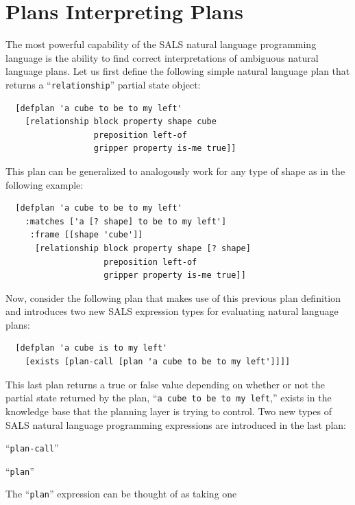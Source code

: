 \section{Plans Interpreting Plans}
\label{section:plans_interpreting_plans}

The most powerful capability of the SALS natural language programming
language is the ability to find correct interpretations of ambiguous
natural language plans.  Let us first define the following simple
natural language plan that returns a ``{\tt{relationship}}'' partial
state object:
\begin{samepage}
\begin{Verbatim}
  [defplan 'a cube to be to my left'
    [relationship block property shape cube
                  preposition left-of
                  gripper property is-me true]]
\end{Verbatim}
\end{samepage}
This plan can be generalized to analogously work for any type of shape
as in the following example:
\begin{samepage}
\begin{Verbatim}
  [defplan 'a cube to be to my left'
    :matches ['a [? shape] to be to my left']
     :frame [[shape 'cube']]
      [relationship block property shape [? shape]
                    preposition left-of
                    gripper property is-me true]]
\end{Verbatim}
\end{samepage}
Now, consider the following plan that makes use of this previous plan
definition and introduces two new SALS expression types for evaluating
natural language plans:
\begin{samepage}
\begin{Verbatim}
  [defplan 'a cube is to my left'
    [exists [plan-call [plan 'a cube to be to my left']]]]
\end{Verbatim}
\end{samepage}
This last plan returns a true or false value depending on whether or
not the partial state returned by the plan, ``{\tt{a cube to be to my
    left}},'' exists in the knowledge base that the planning layer is
trying to control.  Two new types of SALS natural language programming
expressions are introduced in the last plan:
\begin{packed_enumerate}
\item{``{\tt{plan-call}}''}
\item{``{\tt{plan}}''}
\end{packed_enumerate}
The ``{\tt{plan}}'' expression can be thought of as taking one
